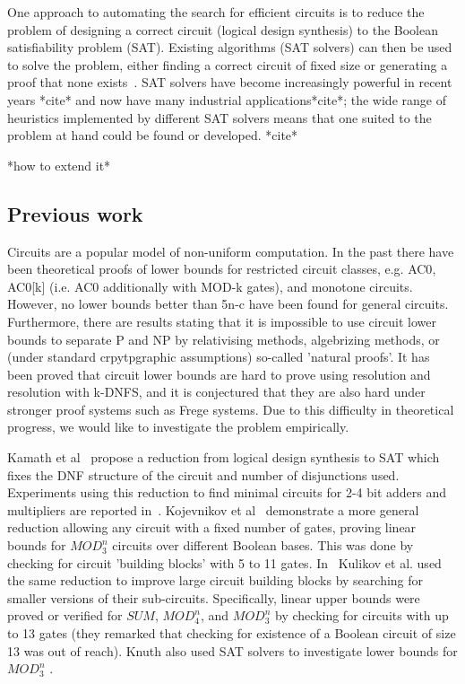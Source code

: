 \documentclass{article}
\begin{document}
One approach to automating the search for efficient circuits is to reduce the problem of designing a correct circuit (logical design synthesis) to the Boolean satisfiability problem (SAT). Existing algorithms (SAT solvers) can then be used to solve the problem, either finding a correct circuit of fixed size or generating a proof that none exists~\cite{kulikov}. SAT solvers have become increasingly powerful in recent years *cite* and now have many industrial applications*cite*; the wide range of heuristics implemented by different SAT solvers means that one suited to the problem at hand could be found or developed. *cite* 

*how to extend it*

\subsection{Previous work}

Circuits are a popular model of non-uniform computation. In the past there have been theoretical proofs of lower bounds for restricted circuit classes, e.g. AC0\cite{furst81}\cite{ajtai83}, AC0[k] (i.e. AC0 additionally with MOD-k gates)\cite{razborov87}\cite{smolensky87}, and monotone circuits\cite{razborov85}. However, no lower bounds better than 5n-c\cite{iwama02} have been found for general circuits. Furthermore, there are results stating that it is impossible to use circuit lower bounds to separate P and NP by relativising methods\cite{baker75}, algebrizing methods\cite{aaronson09}, or (under standard crpytpgraphic assumptions) so-called 'natural proofs'\cite{razborov94}. It has been proved that circuit lower bounds are hard to prove using resolution and resolution with k-DNFS, and it is conjectured that they are also hard under stronger proof systems such as Frege systems\cite{raz}. Due to this difficulty in theoretical progress, we would like to investigate the problem empirically.

Kamath et al~\cite{kamath} propose a reduction from logical design synthesis to SAT which fixes the DNF structure of the circuit and number of disjunctions used. Experiments using this reduction to find minimal circuits for 2-4 bit adders and multipliers are reported in~\cite{estrada}. Kojevnikov et al~\cite{kulikov} demonstrate a more general reduction allowing any circuit with a fixed number of gates, proving linear bounds for \(MOD^n_3\) circuits over different Boolean bases. This was done by checking for circuit 'building blocks' with 5 to 11 gates. In~\cite{kulikovlocal} Kulikov et al. used the same reduction to improve large circuit building blocks by searching for smaller versions of their sub-circuits. Specifically, linear upper bounds were proved or verified for \(SUM\), \(MOD^n_4\), and \(MOD^n_3\) by checking for circuits with up to 13 gates (they remarked that checking for existence of a Boolean circuit of size 13 was out of reach). Knuth also used SAT solvers to investigate lower bounds for \(MOD^n_3\) \cite{knuth15}.
\end{document}

